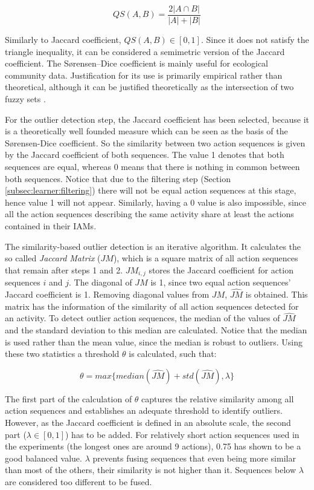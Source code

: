 \begin{equation}
 QS(A, B) = \frac{2 |A \cap B|}{|A| + |B|}
\end{equation}

Similarly to Jaccard coefficient, $QS(A, B) \in [0, 1]$. Since it does not satisfy the triangle inequality, it can be considered a semimetric version of the Jaccard coefficient. The S{\o}rensen–Dice coefficient is mainly useful for ecological community data. Justification for its use is primarily empirical rather than theoretical, although it can be justified theoretically as the intersection of two fuzzy sets \cite{Roberts1986}. 

For the outlier detection step, the Jaccard coefficient has been selected, because it is a theoretically well founded measure which can be seen as the basis of the S{\o}rensen-Dice coefficient. So the similarity between two action sequences is given by the Jaccard coefficient of both sequences. The value 1 denotes that both sequences are equal, whereas 0 means that there is nothing in common between both sequences. Notice that due to the filtering step (Section \ref{subsec:learner:filtering}) there will not be equal action sequences at this stage, hence value 1 will not appear. Similarly, having a 0 value is also impossible, since all the action sequences describing the same activity share at least the actions contained in their IAMs. 

The similarity-based outlier detection is an iterative algorithm. It calculates the so called \textit{Jaccard Matrix} ($JM$), which is a square matrix of all action sequences that remain after steps 1 and 2. $JM_{i, j}$ stores the Jaccard coefficient for action sequences $i$ and $j$. The diagonal of $JM$ is 1, since two equal action sequences' Jaccard coefficient is 1. Removing diagonal values from $JM$, $\hat{JM}$ is obtained. This matrix has the information of the similarity of all action sequences detected for an activity. To detect outlier action sequences, the median of the values of $\hat{JM}$ and the standard deviation to this median are calculated. Notice that the median is used rather than the mean value, since the median is robust to outliers. Using these two statistics a threshold $\theta$ is calculated, such that:

\begin{equation}
\label{eq-threshold}
 \theta = max \{ median(\hat{JM}) + std(\hat{JM}), \lambda \}
\end{equation}

The first part of the calculation of $\theta$ captures the relative similarity among all action sequences and establishes an adequate threshold to identify outliers. However, as the Jaccard coefficient is defined in an absolute scale, the second part ($\lambda \in [0, 1]$) has to be added. For relatively short action sequences used in the experiments (the longest ones are around 9 actions), 0.75 has shown to be a good balanced value. $\lambda$ prevents fusing sequences that even being more similar than most of the others, their similarity is not higher than it. Sequences below $\lambda$ are considered too different to be fused. 

